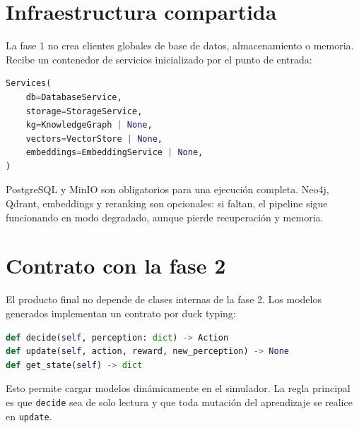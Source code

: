 \section{Infraestructura compartida}

La fase 1 no crea clientes globales de base de datos, almacenamiento o memoria.
Recibe un contenedor de servicios inicializado por el punto de entrada:

\begin{lstlisting}[language=Python]
Services(
    db=DatabaseService,
    storage=StorageService,
    kg=KnowledgeGraph | None,
    vectors=VectorStore | None,
    embeddings=EmbeddingService | None,
)
\end{lstlisting}

PostgreSQL y MinIO son obligatorios para una ejecución completa. Neo4j, Qdrant,
embeddings y reranking son opcionales: si faltan, el pipeline sigue funcionando
en modo degradado, aunque pierde recuperación y memoria.

\section{Contrato con la fase 2}

El producto final no depende de clases internas de la fase 2. Los modelos
generados implementan un contrato por duck typing:

\begin{lstlisting}[language=Python]
def decide(self, perception: dict) -> Action
def update(self, action, reward, new_perception) -> None
def get_state(self) -> dict
\end{lstlisting}

Esto permite cargar modelos dinámicamente en el simulador. La regla principal es
que \texttt{decide} sea de solo lectura y que toda mutación del aprendizaje se
realice en \texttt{update}.

